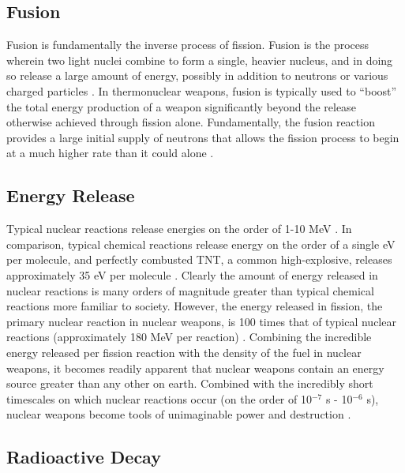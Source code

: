 \documentclass{report}
\begin{document}
\subsection{Fusion}

Fusion is fundamentally the inverse process of fission. Fusion is the process wherein two light nuclei combine to form a single, heavier nucleus, and in doing so release a large amount of energy, possibly in addition to neutrons or various charged particles \cite{krane1987introductory,Dolan1982}. In thermonuclear weapons, fusion is typically used to \enquote{boost} the total energy production of a weapon significantly beyond the release otherwise achieved through fission alone. Fundamentally, the fusion reaction provides a large initial supply of neutrons that allows the fission process to begin at a much higher rate than it could alone \cite{Prussin2014}. 

\subsection{Energy Release}

Typical nuclear reactions release energies on the order of 1-10 MeV \cite{Prussin2014}. In comparison, typical chemical reactions release energy on the order of a single eV per molecule, and perfectly combusted TNT, a common high-explosive, releases approximately 35 eV per molecule \cite{Prussin2014}. Clearly the amount of energy released in nuclear reactions is many orders of magnitude greater than typical chemical reactions more familiar to society. However, the energy released in fission, the primary nuclear reaction in nuclear weapons, is 100 times that of typical nuclear reactions (approximately 180 MeV per reaction) \cite{krane1987introductory,Loveland2005}. Combining the incredible energy released per fission reaction with the density of the fuel in nuclear weapons, it becomes readily apparent that nuclear weapons contain an energy source greater than any other on earth. Combined  with the incredibly short timescales on which nuclear reactions occur (on the order of 10\(^{-7}\) s - 10\(^{-6}\) s),  nuclear weapons become tools of unimaginable power and destruction \cite{Loveland2005,Cochran1994}.  


\subsection{Radioactive Decay}
\end{document}
